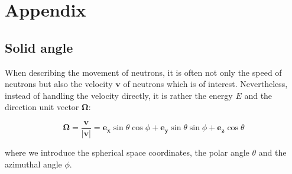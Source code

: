 % 
%
% 
%
%
%
%
%

\section{Appendix}

\subsection{Solid angle}

When describing the movement of neutrons, it is often not only the speed of neutrons but also the velocity $\mathbf{v}$ of neutrons which is of interest. Nevertheless, instead of handling the velocity directly, it is rather the energy $E$ and the direction unit vector $\mathbf{\Omega}$:

\begin{equation}
\mathbf{\Omega}=\frac{\mathbf{v}}{|\mathbf{v}|}=\mathbf{e_x}\sin\theta\cos\phi+\mathbf{e_y}\sin\theta\sin\phi+\mathbf{e_z}\cos\theta
\end{equation}

\noindent where we introduce the spherical space coordinates, the polar angle $\theta$ and the azimuthal angle $\phi$. 


